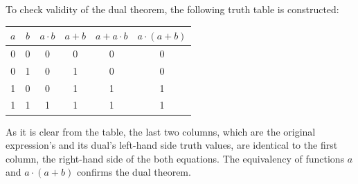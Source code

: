 \documentclass[pdftex,12pt,a4paper]{article}
\begin{document}
\begin{itemize}
To check validity of the dual theorem, the following truth table is constructed:

\begin{center}
\begin{tabular}{|c|c|c|c|c|c|}
\hline
$a$ & $b$ & $a \cdot b$ & $a+b$ & $a + a \cdot b$ & $a \cdot (a + b)$ \\
\hline
0 & 0 & 0 & 0 & 0 & 0 \\
0 & 1 & 0 & 1 & 0 & 0 \\
1 & 0 & 0 & 1 & 1 & 1 \\
1 & 1 & 1 & 1 & 1 & 1 \\
\hline
\end{tabular}
\end{center}
As it is clear from the table, the last two columns, which are the original expression's and its dual's left-hand side truth values, are identical to the first column, the right-hand side of the both equations. The equivalency of functions $a$ and $a \cdot (a+b)$ confirms the dual theorem. \\ 


\end{itemize}
\end{document}
